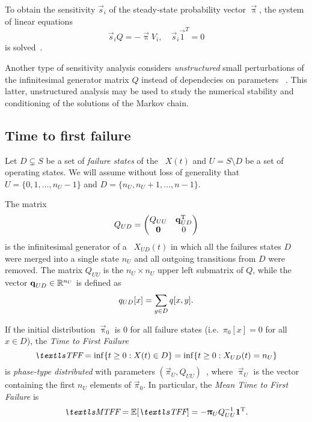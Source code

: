 To obtain the sensitivity $\vec{s}_i$ of the steady-state probability
vector $\vec{\uppi}$, the system of linear equations
\begin{equation}
  \label{eq:background:ctmc:sensitvity:s}
  \vec{s}_i Q = -\vec{\uppi} V_i, \quad \vec{s}_i \vec{1}^T = 0
\end{equation}
is solved~\citep{DBLP:conf/sigmetrics/BlakeRT88}.

Another type of sensitivity analysis considers \emph{unstructured}
small perturbations of the infinitesimal generator matrix $Q$ instead
of dependecies on parameters%
~\citep{funderlic1986sensitivity,ipsen1994uniform}. This latter,
unstructured analysis may be used to study the numerical stability and
conditioning of the solutions of the Markov chain.

\subsection{Time to first failure}
\label{ssec:background:mtff}

Let $D \subsetneq S$ be a set of \emph{failure states} of the \CTMC\ 
$X(t)$ and $U = S \setminus D$ be a set of operating states. We will
assume without loss of generality that $U = \{0, 1, \ldots, n_U - 1\}$
and $D = \{ n_U, n_U + 1, \ldots, n - 1 \}$.

The matrix
\begin{equation}
  Q_{UD} = \begin{pmatrix}
    Q_{UU} & \bm{\mathrm{q}}_{UD}^{\mathrm{T}} \\
    \bm{\mathrm{0}} & 0
  \end{pmatrix}
\end{equation}
is the infinitesimal generator of a \CTMC\ $X_{UD}(t)$ in which all
the failures states $D$ were merged into a single state $n_U$ and all
outgoing transitions from $D$ were removed. The matrix $Q_{UU}$ is the
$n_U \times n_U$ upper left submatrix of $Q$, while the vector
$\bm{\mathrm{q}}_{UD} \in \mathbb{R}^{n_U}$ is defined as
\begin{equation}
  q_{UD}[x] = \sum_{y \in D} q[x, y] \text.
\end{equation}

If the initial distribution $\vec{\uppi}_0$ is $0$ for all failure
states (i.e.~$\pi_0[x] = 0$ for all $x \in D$), the \emph{Time
  to First Failure}
\begin{equation}
  \TFF = \inf \{ t \ge 0 : X(t) \in D \} = \inf \{ t \ge 0 : X_{UD}(t)
  = n_U \}
\end{equation}
is \emph{phase-type distributed} with parameters
$(\vec{\pi}_{U}, Q_{UU})$~\citep{NEUT75}, where $\vec{\uppi}_U$ is the
vector containing the first $n_U$ elements of $\vec{\pi}_0$. In
particular, the \emph{Mean Time to First Failure} is
\begin{equation}
  \label{eq:background:mtff}
  \MTFF = \Ex[\TFF] = - \vec{\uppi}_U Q_{UU}^{-1} \vec{1}^\T \text.
\end{equation}

